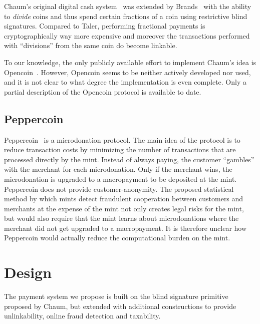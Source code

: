 \documentclass{llncs}
\begin{document}
Chaum's original digital cash system~\cite{chaum1983blind} was
extended by Brands~\cite{brands1993efficient} with the ability to {\em
  divide} coins and thus spend certain fractions of a coin using
restrictive blind signatures.  Compared to Taler, performing
fractional payments is cryptographically way more expensive and
moreover the transactions performed with ``divisions'' from the same
coin do become linkable.
%
%

To our knowledge, the only publicly available effort to implement
Chaum's idea is Opencoin~\cite{dent2008extensions}.  However, Opencoin
seems to be neither actively developed nor used, and it is not clear
to what degree the implementation is even complete.  Only a partial
description of the Opencoin protocol is available to date.


\subsection{Peppercoin}

Peppercoin~\cite{rivest2004peppercoin} is a microdonation protocol.
The main idea of the protocol is to reduce transaction costs by
minimizing the number of transactions that are processed directly by
the mint.  Instead of always paying, the customer ``gambles'' with the
merchant for each microdonation.  Only if the merchant wins, the
microdonation is upgraded to a macropayment to be deposited at the
mint.  Peppercoin does not provide customer-anonymity.  The proposed
statistical method by which mints detect fraudulent cooperation between
customers and merchants at the expense of the mint not only creates
legal risks for the mint, but would also require that the mint learns
about microdonations where the merchant did not get upgraded to a 
macropayment.  It is therefore unclear how Peppercoin would actually
reduce the computational burden on the mint.


\section{Design}

The payment system we propose is built on the blind signature
primitive proposed by Chaum, but extended with additional
constructions to provide unlinkability, online fraud detection and
taxability.
\end{document}
